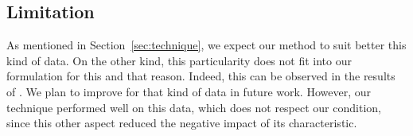 \subsection{Limitation}
%
As mentioned in Section~\ref{sec:technique}, we expect our method to suit better this kind of data. On the other kind, this particularity does not fit into our formulation for this and that reason. Indeed, this can be observed in the results of . 
We plan to improve for that kind of data in future work. However, our technique performed well on this data, which does not respect our condition, since this other aspect reduced the negative impact of its characteristic.